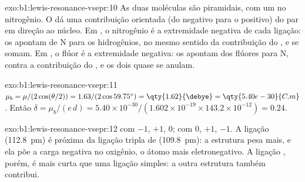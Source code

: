 \begin{solution}{exo:b1:lewis-resonance-vsepr:10}
As duas moléculas são piramidais, com um  no nitrogênio.
O  dá uma contribuição orientada (do negativo para o
positivo) do par em direção ao núcleo. Em , o nitrogênio é a
extremidade negativa de cada ligação: os  apontam de N
para os hidrogênios, no mesmo sentido da contribuição do ,
e se somam. Em , o flúor é a extremidade negativa: os  apontam dos flúores para N, contra a contribuição do , e os dois quase se anulam.
\end{solution}

\begin{solution}{exo:b1:lewis-resonance-vsepr:11}
$\mu_b = \mu/(2\cos(\theta/2)) = 1.63/(2\cos 59.75^\circ) =
\qty{1.62}{\debye} = \qty{5.40e-30}{C.m}$. Então $\delta = \mu_b/(e\,d) =
5.40 \times 10^{-30}/(1.602 \times 10^{-19} \times 143.2 \times 10^{-12})
= 0.24$.
\end{solution}

\begin{solution}{exo:b1:lewis-resonance-vsepr:12}
 com  $-1$, $+1$, $0$;  com $0$,
$+1$, $-1$. A ligação  (\qty{112.8}{pm}) é próxima da ligação
tripla de  (\qty{109.8}{pm}): a estrutura  pesa mais, e
ela põe a carga negativa no oxigênio, o átomo mais eletronegativo. A
ligação , porém, é mais curta que uma ligação simples: a outra
estrutura também contribui.
\end{solution}

